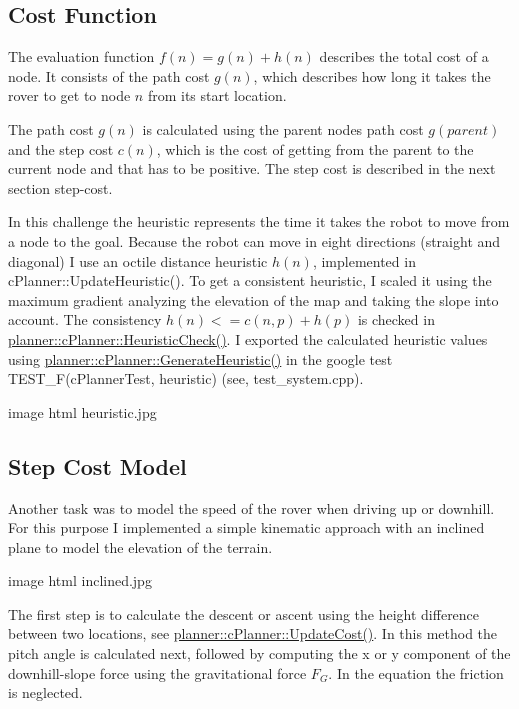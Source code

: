 \subsection*{Cost Function}

The evaluation function $f(n) = g(n) + h(n)$ describes the total cost of a node. It consists of the path cost $g(n)$, which describes how long it takes the rover to get to node $n$ from its start location.

The path cost $g(n)$ is calculated using the parent node\textquotesingle{}s path cost $g(parent)$ and the step cost $c(n)$, which is the cost of getting from the parent to the current node and that has to be positive. The step cost is described in the next section step-\/cost.

In this challenge the heuristic represents the time it takes the robot to move from a node to the goal. Because the robot can move in eight directions (straight and diagonal) I use an octile distance heuristic $h(n)$, implemented in c\+Planner\+::\+Update\+Heuristic(). To get a consistent heuristic, I scaled it using the maximum gradient analyzing the elevation of the map and taking the slope into account. The consistency $ h(n) <= c(n,p) + h(p)$ is checked in \mbox{\hyperlink{classplanner_1_1c_planner_a1234d075676fcaa2c17b859d11b4638c}{planner\+::c\+Planner\+::\+Heuristic\+Check()}}. I exported the calculated heuristic values using \mbox{\hyperlink{classplanner_1_1c_planner_a1a4650050656545744796296a653d388}{planner\+::c\+Planner\+::\+Generate\+Heuristic()}} in the google test T\+E\+S\+T\+\_\+\+F(c\+Planner\+Test, heuristic) (see, test\+\_\+system.\+cpp).

image html heuristic.\+jpg



\subsection*{Step Cost Model}

Another task was to model the speed of the rover when driving up or downhill. For this purpose I implemented a simple kinematic approach with an inclined plane to model the elevation of the terrain.

image html inclined.\+jpg

 

The first step is to calculate the descent or ascent using the height difference between two locations, see \mbox{\hyperlink{classplanner_1_1c_planner_a16e8c156297fff49a6ba9b97073baffb}{planner\+::c\+Planner\+::\+Update\+Cost()}}. In this method the pitch angle is calculated next, followed by computing the x or y component of the downhill-\/slope force using the gravitational force $F_G$. In the equation the friction is neglected.


